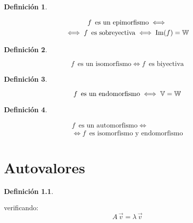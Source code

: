 \documentclass[a5paper,12pt,twoside]{book}
\newtheorem{defn}{{Definición}}[chapter]
\begin{document}
\begin{mdframed}[style=DefinitionFrame]
    \begin{defn}
    \end{defn}
    \begin{multline*}
        f \enspace \textrm{es un epimorfismo} \iff
        \\
        \iff f  \enspace \textrm{es sobreyectiva}
        \iff \operatorname{Im}(f) = \mathbb{W}
    \end{multline*}
\end{mdframed}

\begin{mdframed}[style=DefinitionFrame]
    \begin{defn}
    \end{defn}
    \begin{equation*}
        f \enspace \textrm{es un isomorfismo} \iff f \enspace \textrm{es biyectiva}
    \end{equation*}
\end{mdframed}

\begin{mdframed}[style=DefinitionFrame]
    \begin{defn}
    \end{defn}
    \begin{equation*}
        f \enspace \textrm{es un endomorfismo} \iff \mathbb{V} = \mathbb{W}
    \end{equation*}
\end{mdframed}

\begin{mdframed}[style=DefinitionFrame]
    \begin{defn}
    \end{defn}
    \begin{multline*}
        f \enspace \textrm{es un automorfismo} \iff
        \\
        \iff f \enspace \textrm{es isomorfismo y endomorfismo}
    \end{multline*}
\end{mdframed}


\chapter{Autovalores}

\begin{mdframed}[style=DefinitionFrame]
    \begin{defn}
        \label{defn:autovalor}
    \end{defn}
     verificando:
    \begin{equation*}
        A \, \Vec{v} = \lambda \, \Vec{v}
    \end{equation*}
\end{mdframed}
\end{document}

